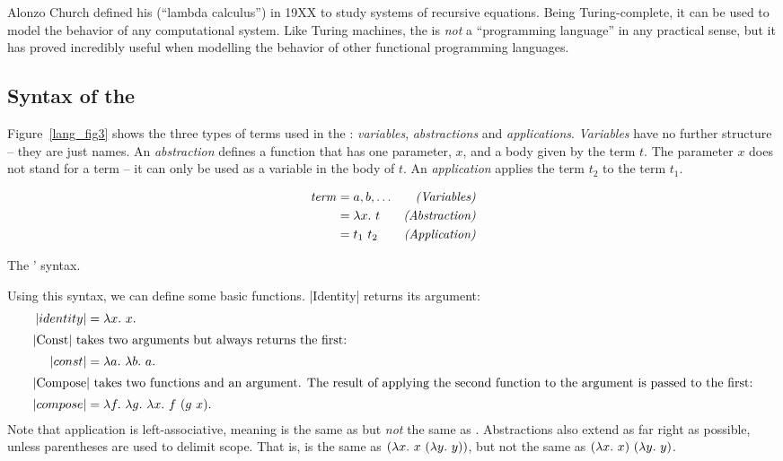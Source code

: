 \documentclass[12pt]{report}
\begin{document}
Alonzo Church defined his \lamA (``lambda calculus'') in 19XX
\citep{ChurchXX} to study systems of recursive equations. Being
Turing-complete, it can be used to model the behavior of any
computational system. Like Turing machines, the \lamA is \emph{not}
a ``programming language'' in any practical sense, but it has proved
incredibly useful when modelling the behavior of other functional
programming languages.

\subsection{Syntax of the \LamA}
\label{lang_sec1_syntax}

Figure~\ref{lang_fig3} shows the three types of terms used in the
\lamA: \emph{variables}, \emph{abstractions} and
\emph{applications}. \emph{Variables} have no further structure --
they are just names. An \emph{abstraction} defines a function that has
one parameter, $x$, and a body given by the term $t$. The parameter
$x$ does not stand for a term -- it can only be used as a variable in
the body of $t$.  An \emph{application} applies the term $t_2$ to the
term $t_1$.

\begin{myfig}[tbh]
  \begin{minipage}{5in}
    \begin{align*}
      \mathit{term} &= a, b, \ldots & \hfill\text{\emph{(Variables)}} \\
      &= \lamAbs{x}{t} & \hfill\text{\emph{(Abstraction)}} \\ 
      &= \lamApp{t_1}{t_2} & \hfill\text{\emph{(Application)}}
    \end{align*}
  \end{minipage}
  \caption{The \lamA' syntax.}
  \label{lang_fig3}
\end{myfig}

Using this syntax, we can define some basic functions. |Identity|
returns its argument:
\begin{align}
  |identity| &= \lambda x.\ x. \label{lang_eq1} \\
  \intertext{|Const| takes two arguments but always returns the first:}
  |const| &= \lambda a.\ \lambda b.\ a. \label{lang_eq_const1} \\
  \intertext{|Compose| takes two functions and an argument. The result of
    applying the second function to the argument is passed to the first:}
  |compose| &= \lambda f.\ \lambda g.\ \lambda x.\ f\ (g\ x). \label{lang_eq_compose1} 
\end{align}
Note that application is left-associative, meaning
 is the same as 
but \emph{not} the same as . Abstractions
also extend as far right as possible, unless parentheses are used to
delimit scope. That is,  is the
same as $(\lambda x.\ x\ (\lambda y.\ y))$, but not the
same as $(\lambda x.\ x)\ (\lambda y.\ y)$.
\end{document}
